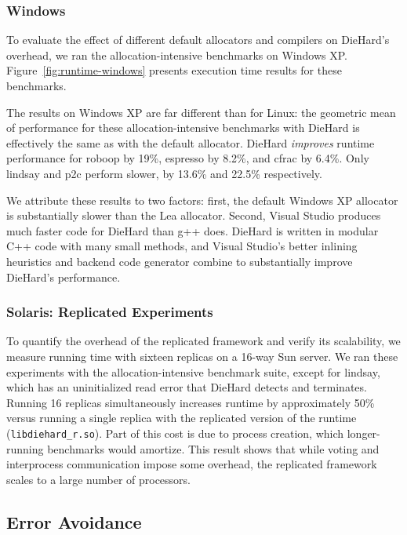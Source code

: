 \documentclass{sig-alternate}
\begin{document}
\subsubsection{Windows}

\noindent
To evaluate the effect of different default allocators and
compilers on DieHard's overhead, we ran the allocation-intensive
benchmarks on Windows XP. Figure~\ref{fig:runtime-windows} presents
execution time results for these benchmarks.

The results on Windows XP are far different than for Linux: the
geometric mean of performance for these allocation-intensive
benchmarks with DieHard is effectively the same as with the default
allocator.  DieHard \emph{improves} runtime performance for
\textsf{roboop} by 19\%,
\textsf{espresso} by 8.2\%, and \textsf{cfrac} by 6.4\%. Only \textsf{lindsay} and \textsf{p2c} perform slower, by 13.6\% and 22.5\% respectively. 

We attribute these results to two factors: first, the default Windows
XP allocator is substantially slower than the Lea allocator. Second,
Visual Studio produces much faster code for DieHard than g++
does. DieHard is written in modular C++ code with many small methods,
and Visual Studio's better inlining heuristics and backend code
generator combine to substantially improve DieHard's performance.

\subsubsection{Solaris: Replicated Experiments}

\noindent
To quantify the overhead of the replicated framework and verify its
scalability, we measure running time with sixteen replicas on a 16-way
Sun server. We ran these experiments with the allocation-intensive
benchmark suite, except for \textsf{lindsay}, which has an
uninitialized read error that DieHard detects and terminates. Running
16 replicas simultaneously increases runtime by approximately 50\%
versus running a single replica with the replicated version of the
runtime (\texttt{libdiehard\_r.so}). Part of this cost is due to
process creation, which longer-running benchmarks would amortize. This
result shows that while voting and interprocess communication impose
some overhead, the replicated framework scales to a large number of
processors.


\subsection{Error Avoidance}
\end{document}
